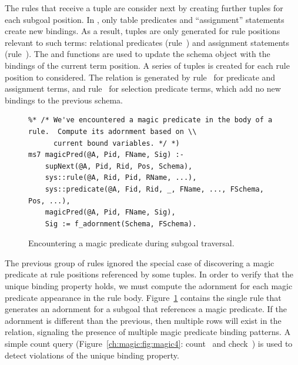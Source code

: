 The rules that receive a  tuple are consider next by creating further
 tuples for each subgoal position.  In \OVERLOG, only table predicates
and ``assignment'' statements create new bindings.  As a result, 
tuples are only generated for rule positions relevant to such terms: relational
predicates (rule~) and assignment statements (rule~).  The
 and  functions are used to update the schema
object with the bindings of the current term position.  A series of
 tuples is created for each rule position to considered.  The
 relation is generated by rule~ for predicate and
assignment terms, and rule~ for selection predicate terms, which add no
new bindings to the previous schema.


\begin{figure}[!t]
\ssp
\centering
\begin{lstlisting}
%* /* We've encountered a magic predicate in the body of a rule.  Compute its adornment based on \\
      current bound variables. */ *)
ms7 magicPred(@A, Pid, FName, Sig) :-
    supNext(@A, Pid, Rid, Pos, Schema),
    sys::rule(@A, Rid, Pid, RName, ...),
    sys::predicate(@A, Fid, Rid, _, FName, ..., FSchema, Pos, ...),
    magicPred(@A, Pid, FName, Sig),
    Sig := f_adornment(Schema, FSchema).
\end{lstlisting}
\caption{\label{ch:magic:fig:magic3}Encountering a magic predicate during subgoal traversal.}
\end{figure}

The previous group of rules ignored the special case of discovering a magic
predicate at rule positions referenced by some  tuples.  In order
to verify that the unique binding property holds, we must compute the adornment
for each magic predicate appearance in the rule body.
Figure~\ref{ch:magic:fig:magic3} contains the single rule that generates an
adornment for a subgoal that references a magic predicate.  If the adornment is
different than the previous, then multiple rows will exist in the
 relation, signaling the presence of multiple magic predicate
binding patterns.  A simple count query (Figure~\ref{ch:magic:fig:magic4}:
count~ and check~) is used to detect violations of the unique
binding property.

